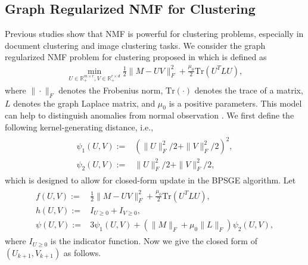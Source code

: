 \documentclass[letterpaper]{article} %
\begin{document}
	\subsection{Graph Regularized NMF for Clustering}
	Previous studies \cite{Cai11GNMF, ShahnazBPP06, AhmedHAD21}  show that NMF is  powerful for clustering problems, especially in document clustering and image clustering tasks.
	We consider the   graph regularized NMF problem for clustering proposed in \cite{Cai11GNMF} which is defined as
	\begin{eqnarray}
		\min_{U\in\mathbb{R}^{m\times r}_{+},V\in\mathbb{R}^{r\times d}_{+}} \frac{1}{2}\|M-UV\|_{F}^{2}+\frac{\mu_{0}}{2}\text{Tr}(U^{T}LU), \label{GNMF}
	\end{eqnarray}
	where   $\|\cdot\|_{F}$ denotes the Frobenius norm, $\text{Tr}(\cdot)$ denotes the trace of a matrix, $L$ denotes the graph Laplace matrix,  and $\mu_{0}$ is a positive parameters.
	This model can help to distinguish anomalies from normal observation \cite{AhmedHAD21}.
	We first define the following  kernel-generating distance, i.e.,
	\begin{eqnarray}
		\begin{aligned}
			\psi_{1}(U,V):=&\left(\|U\|_{F}^{2}/2+\|V\|_{F}^{2}/2\right)^{2},\\ \psi_{2}(U,V):=&\|U\|_{F}^{2}/2+\|V\|_{F}^{2}/2,
		\end{aligned}\label{kernels}
	\end{eqnarray}
	which is designed to allow for closed-form update in the BPSGE algorithm.
	Let
	\begin{eqnarray}
		\begin{aligned}
			f(U,V):=&\frac{1}{2}\|M-UV\|_{F}^{2}+\frac{\mu_{0}}{2}\text{Tr}(U^{T}LU),\\
			h(U,V):=&I_{U\ge 0}+I_{V\ge 0},\\
			\psi(U,V):=&3\psi_{1}(U,V)+(\|M\|_{F}+\mu_{0}\|L\|_{F})\psi_{2}(U,V),
		\end{aligned}\label{fh_def_01}
	\end{eqnarray}
	where $I_{U\ge0}$ is the indicator function.
	Now we give the closed form of $(U_{k+1},V_{k+1})$ as follows.
\end{document}
